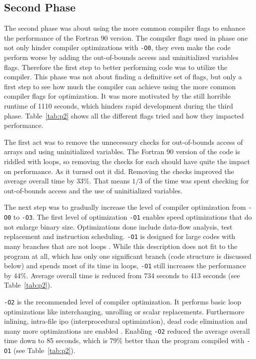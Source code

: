 \documentclass[twoside,11pt]{article}
\begin{document}

\subsection{Second Phase} %
\label{subsec:p2}

The second phase was about using the more common compiler flags to
enhance the performance of the Fortran 90 version.
The compiler flags used in phase one not only hinder compiler
optimizations with \texttt{-O0}, they even make the code perform worse
by adding the out-of-bounds access and uninitialized variables flags.
Therefore the first step to better performing code was to utilize the
compiler.
This phase was not about finding a definitive set of flags, but only
a first step to see how much the compiler can achieve using the
more common compiler flags for optimization.
It was more motivated by the still horrible runtime of 1110 seconds,
which hinders rapid development during the third phase.
Table~\ref{tab:p2} shows all the different flags tried and how they
impacted performance.

The first act was to remove the unnecessary checks for out-of-bounds
access of arrays and using uninitialized variables.
The Fortran 90 version of the code is riddled with loops, so removing
the checks for each should have quite the impact on performance.
As it turned out it did.
Removing the checks improved the average overall time by $33\%$.
That means $1/3$ of the time was spent checking for out-of-bounds
access and the use of uninitialized variables.

The next step was to gradually increase the level of compiler
optimization from \texttt{-O0} to \texttt{-O3}.
The first level of optimization \texttt{-O1} enables speed
optimizations that do not enlarge binary size.
Optimizations done include data-flow analysis, test replacement and
instruction scheduling.
\texttt{-O1} is designed for large codes with many branches that
are not loops \citep{o}.
While this description does not fit to the program at all, which
has only one significant branch (code structure is discussed below)
and spends most of its time in loops, \texttt{-O1} still increases
the performance by 44\%.
Average overall time is reduced from 734 seconds to 413 seconds
(see Table~\ref{tab:p2}).

\texttt{-O2} is the recommended level of compiler optimization.
It performs basic loop optimizations like interchanging, unrolling or
scalar replacements.
Furthermore inlining, intra-file ipo (interprocedural optimization),
dead code elimination and many more optimizations are enabled
\citep[see][]{o}.
Enabling \texttt{-O2} reduced the average overall time down to
85 seconds, which is 79\% better than the program compiled with
\texttt{-O1} (see Table~\ref{tab:p2}).
\end{document}
